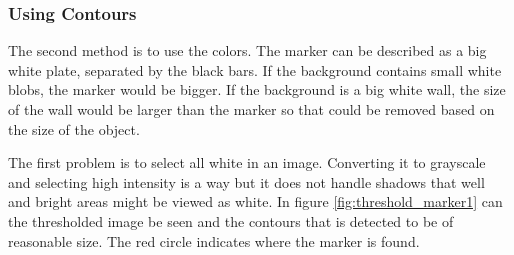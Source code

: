\subsubsection{Using Contours}
The second method is to use the colors. The marker can be described as a big white plate, separated by the black bars.
If the background contains small white blobs, the marker would be bigger.
If the background is a big white wall, the size of the wall would be larger than the marker so that could be removed based on the size of the object.

The first problem is to select all white in an image.
Converting it to grayscale and selecting high intensity is a way but it does not handle shadows that well and bright areas might be viewed as white.
In figure \ref{fig:threshold_marker1} can the thresholded image be seen and the contours that is detected to be of reasonable size.
The red circle indicates where the marker is found.

